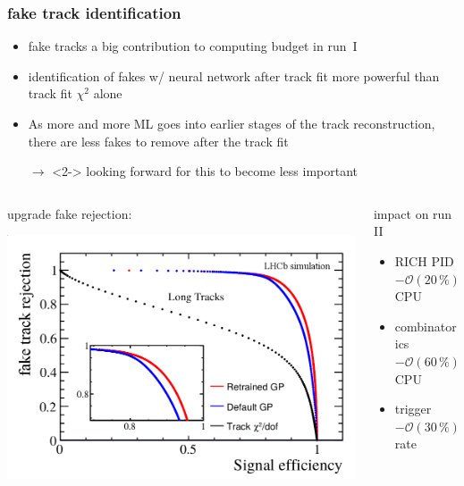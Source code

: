 \documentclass[table,xcolor=dvipsnames,professionalfonts]{beamer}
\begin{document}
\begin{frame}
  \frametitle{fake track identification}
  \begin{itemize}
      \item fake tracks a big contribution to computing budget in run~I
      \item identification of fakes w/ neural network after track fit more powerful than track fit $\chi^2$ alone
      \item<2-> As more and more ML goes into earlier stages of the track reconstruction, there are less fakes to remove after the track fit
      \item[$\rightarrow$]<2-> looking forward for this to become less important
  \end{itemize}
  \begin{columns}
    \begin{column}{.5\textwidth}
      upgrade fake rejection:

  \includegraphics[width=\textwidth]{./GPlong.png}
\end{column}
    \begin{column}{.5\textwidth}
      \begin{exampleblock}{impact on run II}
        \begin{itemize}
          \item RICH PID $- \mathcal{O}(20\,\%)$ CPU
            \item combinatorics $- \mathcal{O}(60\,\%)$ CPU
            \item trigger $- \mathcal{O}(30\,\%)$ rate
        \end{itemize}
      \end{exampleblock}
\end{column}
\end{columns}

\end{frame}
\end{document}
